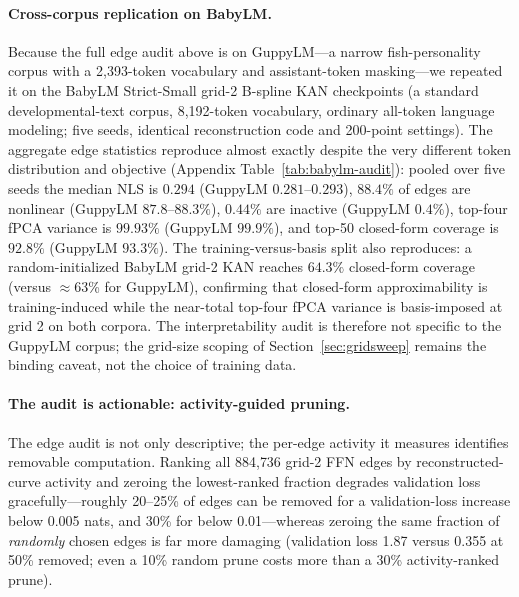\documentclass{article}
\begin{document}
\paragraph{Cross-corpus replication on BabyLM.}
\label{sec:babylm-audit}
Because the full edge audit above is on GuppyLM---a narrow fish-personality corpus with a 2,393-token vocabulary and assistant-token masking---we repeated it on the BabyLM Strict-Small grid-2 B-spline KAN checkpoints (a standard developmental-text corpus, 8,192-token vocabulary, ordinary all-token language modeling; five seeds, identical reconstruction code and 200-point settings). The aggregate edge statistics reproduce almost exactly despite the very different token distribution and objective (Appendix Table~\ref{tab:babylm-audit}): pooled over five seeds the median NLS is \(0.294\) (GuppyLM \(0.281\)--\(0.293\)), \(88.4\%\) of edges are nonlinear (GuppyLM \(87.8\)--\(88.3\%\)), \(0.44\%\) are inactive (GuppyLM \(0.4\%\)), top-four fPCA variance is \(99.93\%\) (GuppyLM \(99.9\%\)), and top-50 closed-form coverage is \(92.8\%\) (GuppyLM \(93.3\%\)). The training-versus-basis split also reproduces: a random-initialized BabyLM grid-2 KAN reaches \(64.3\%\) closed-form coverage (versus \(\approx\)63\% for GuppyLM), confirming that closed-form approximability is training-induced while the near-total top-four fPCA variance is basis-imposed at grid 2 on both corpora. The interpretability audit is therefore not specific to the GuppyLM corpus; the grid-size scoping of Section~\ref{sec:gridsweep} remains the binding caveat, not the choice of training data.

\paragraph{The audit is actionable: activity-guided pruning.}
The edge audit is not only descriptive; the per-edge activity it measures identifies removable computation. Ranking all 884{,}736 grid-2 FFN edges by reconstructed-curve activity and zeroing the lowest-ranked fraction degrades validation loss gracefully---roughly 20--25\% of edges can be removed for a validation-loss increase below 0.005 nats, and 30\% for below 0.01---whereas zeroing the same fraction of \emph{randomly} chosen edges is far more damaging (validation loss 1.87 versus 0.355 at 50\% removed; even a 10\% random prune costs more than a 30\% activity-ranked prune).
\end{document}
